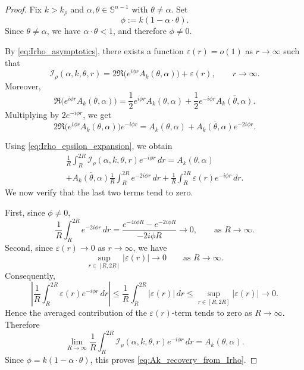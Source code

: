 \documentclass[12pt,a4paper]{amsart}
\numberwithin{equation}{section}
\theoremstyle{plain}
\theoremstyle{definition}
\begin{document}
\begin{proof}
Fix $k>k_\rho$ and $\alpha,\theta\in\mathbb S^{n-1}$ with
$\theta\neq\alpha$. Set
\begin{equation}
    \phi := k(1-\alpha\cdot\theta).
\end{equation}
Since $\theta\neq\alpha$, we have $\alpha\cdot\theta<1$, and therefore
$\phi\neq 0$.

By \eqref{eq:Irho_asymptotics}, there exists a function
$\varepsilon(r)=o(1)$ as $r\to\infty$ such that
\begin{equation}\label{eq:Irho_epsilon_expansion}
    \mathcal I_\rho(\alpha,k,\theta,r)
    =
    2\Re\bigl(e^{i\phi r}A_k(\theta,\alpha)\bigr)
    +
    \varepsilon(r),
    \qquad r\to\infty.
\end{equation}
Moreover,
\begin{equation}
    \Re\bigl(e^{i\phi r}A_k(\theta,\alpha)\bigr)
    =
    \frac{1}{2}  e^{i\phi r}A_k(\theta,\alpha)
    +
    \frac{1}{2} e^{-i\phi r}\overline{A_k(\theta,\alpha)} .
\end{equation}
Multiplying by $2e^{-i\phi r}$, we get
\begin{equation}
    2\Re\bigl(e^{i\phi r}A_k(\theta,\alpha)\bigr)e^{-i\phi r}
    =
    A_k(\theta,\alpha)
    +
    \overline{A_k(\theta,\alpha)} e^{-2i\phi r}.
\end{equation}

Using \eqref{eq:Irho_epsilon_expansion}, we obtain
\begin{multline*}
    \frac{1}{R}\int_R^{2R}
    \mathcal I_\rho(\alpha,k,\theta,r)e^{-i\phi r}\,dr
    = A_k(\theta,\alpha)\\
    + 
    \overline{A_k(\theta,\alpha)}
    \frac{1}{R}\int_R^{2R}e^{-2i\phi r}\,dr
    +
    \frac{1}{R}\int_R^{2R} \varepsilon(r)e^{-i\phi r}\,dr .
\end{multline*}
We now verify that the last two terms tend to zero.

First, since $\phi\neq 0$,
\begin{equation}
    \frac{1}{R}\int_R^{2R} e^{-2i\phi r}\,dr
    =
    \frac{e^{-4i\phi R}-e^{-2i\phi R}}{-2i\phi R}
    \to 0,
    \qquad
    \text{as } R\to\infty .
\end{equation}
Second, since $\varepsilon(r)\to0$ as $r\to\infty$, we have
\begin{equation}
    \sup_{r\in[R,2R]}|\varepsilon(r)|\to0
    \qquad \text{as } R\to\infty.
\end{equation}
Consequently,
\begin{equation}
\left|
    \frac{1}{R}\int_R^{2R} \varepsilon(r)e^{-i\phi r}\,dr
    \right|
    \le
    \frac{1}{R}\int_R^{2R} |\varepsilon(r)|\,dr
    \le
    \sup_{r\in[R,2R]}|\varepsilon(r)|
    \to0 .
\end{equation}
Hence the averaged contribution of the $\varepsilon(r)$-term tends to zero as $R\to\infty$. Therefore
\begin{equation}
    \lim_{R\to\infty}
    \frac{1}{R}\int_R^{2R}
    \mathcal I_\rho(\alpha,k,\theta,r)e^{-i\phi r}\,dr
    =
    A_k(\theta,\alpha).
\end{equation}
Since $\phi=k(1-\alpha\cdot\theta)$, this proves
\eqref{eq:Ak_recovery_from_Irho}.
\end{proof}
\end{document}
